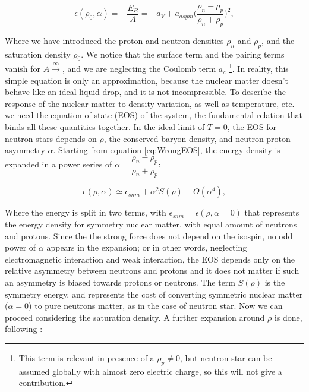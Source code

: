 \begin{equation} \label{eq:WrongEOS}
\epsilon (\rho_{0}, \alpha) = -\frac{E_{B}}{A} = -a_{V} + a_{asym} \bigl(\dfrac{\rho_{n} - \rho_{p}}{\rho_{n} + \rho_{p}} \bigl)^{2} ,
\end{equation}

Where we have introduced the proton and neutron densities $\rho_{n}$ and $\rho_{p}$, and the saturation density $\rho_{0}$. We notice that the surface term and the pairing terms vanish for $A \xrightarrow \infty$, and we are neglecting the Coulomb term $a_{c}$ \footnote{This term is relevant in presence of a $\rho_{p} \neq 0 $, but neutron star can be assumed globally with almost zero electric charge, so this will not give a contribution.}.
In reality, this simple equation is only an approximation, because the nuclear matter doesn't behave like an ideal liquid drop, and it is not incompressible. To describe the response of the nuclear matter to density variation, as well as temperature, etc. we need the equation of state (EOS) of the system, the fundamental relation that binds all these quantities together. In the ideal limit of $T = 0$, the EOS for neutron stars depends on $\rho$, the conserved baryon density, and neutron-proton asymmetry $\alpha$. Starting from equation \ref{eq:WrongEOS}, the energy density is expanded in a power series of $\alpha = \dfrac{\rho_{n} - \rho_{p}}{\rho_{n} + \rho_{p}}$:

\begin{equation}
\epsilon (\rho,\alpha) \simeq \epsilon_{snm} + \alpha ^{2} S(\rho) + O(\alpha ^{4}) ,
\end{equation}

Where the energy is split in two terms, with $\epsilon_{snm} = \epsilon (\rho, \alpha = 0)$ that represents the energy density for symmetry nuclear matter, with equal amount of neutrons and protons. Since the the strong force does not depend on the isospin, no odd power of $\alpha$ appears in the expansion; or in other words, neglecting electromagnetic interaction and weak interaction, the EOS depends only on the relative asymmetry between neutrons and protons and it does not matter if such an asymmetry is biased towards protons or neutrons. The term $S(\rho)$ is the symmetry energy, and represents the cost of converting symmetric nuclear matter ($\alpha = 0$) to pure neutrons matter, as in the case of neutron star. Now we can proceed considering the saturation density. A further expansion around $\rho$ is done, following \cite{Piekarewicz_2009}:
	
